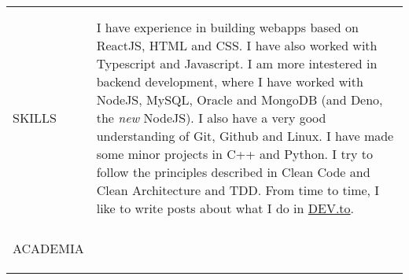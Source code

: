 \documentclass[letterpaper,10pt,oneside]{article}
\newcommand{\DatestampY}[1]{#1}
\newenvironment{body}
{\par\par
\begin{longtable}{p{0.125\textwidth}p{0.84\textwidth}}}
{\par\end{longtable}\par}
\renewcommand{\section}[3]{\\[-0.7cm]\pdfbookmark[2]{#2}{#3}\\%
\raggedleft  %
{\fontsize{9.5pt}{9.5pt}\selectfont\bfseries\raggedright%
\MakeUppercase{#1}}&}
\newcommand{\SmallEntryGap}{\par\vspace{0.38em}\par}
\begin{document}
\begin{body}
\SmallEntryGap



\section{Skills}{Skills}{PDF:Skills}

I have experience in building webapps based on ReactJS, HTML and CSS. I have also worked  with Typescript and Javascript. I am more intestered in backend development, where I have worked with NodeJS, MySQL, Oracle and MongoDB (and Deno, the \textit{new} NodeJS). I also have a very good understanding of Git, Github and Linux. I have made some minor projects in C++ and Python. I try to follow the principles described in Clean Code and Clean Architecture and TDD. From time to time, I like to write posts about what I do in \href{https://dev.to/antoniogamiz}{DEV.to}.


\section{Academia}{Academia}{PDF:Academia}


\end{body}
\end{document}

